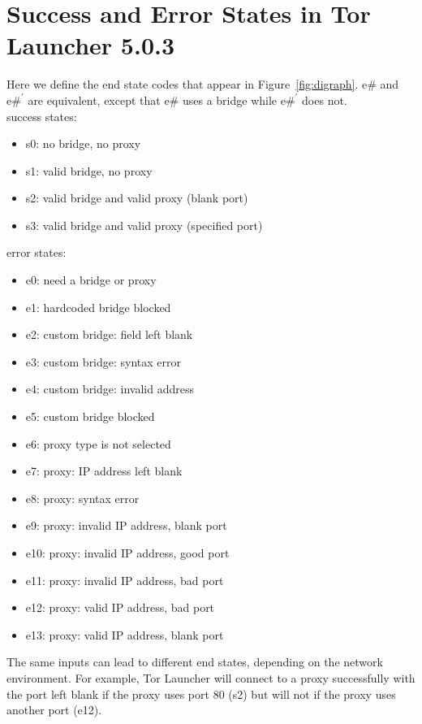 \documentclass[USenglish,oneside,twocolumn]{article}
\begin{document}



\appendix

\section{Success and Error States in Tor Launcher 5.0.3} 
\label{states} 
Here we define the end state codes that appear in Figure~\ref{fig:digraph}.
e\# and $\mbox{e\#}^\prime$ are equivalent, except that e\# uses a bridge while $\mbox{e\#}^\prime$ does not. \\

\noindent success states: 
\begin{itemize}
\item s0: no bridge, no proxy
\item s1: valid bridge, no proxy
\item s2: valid bridge and valid proxy (blank port)
\item s3: valid bridge and valid proxy (specified port)
\end{itemize}

error states:
\begin{itemize} 
\item e0: need a bridge or proxy
\item e1: hardcoded bridge blocked
\item e2: custom bridge: field left blank
\item e3: custom bridge: syntax error
\item e4: custom bridge: invalid address
\item e5: custom bridge blocked
\item e6: proxy type is not selected
\item e7: proxy: IP address left blank
\item e8: proxy: syntax error
\item e9: proxy: invalid IP address, blank port
\item e10: proxy: invalid IP address, good port
\item e11: proxy: invalid IP address, bad port
\item e12: proxy: valid IP address, bad port
\item e13: proxy: valid IP address, blank port
\end{itemize} 

The same inputs can lead to different end states,
depending on the network environment.
For example, Tor Launcher will connect to a proxy successfully with the port left blank if the proxy uses port 80 (s2) but will not if the proxy uses another port (e12). 
\end{document}

